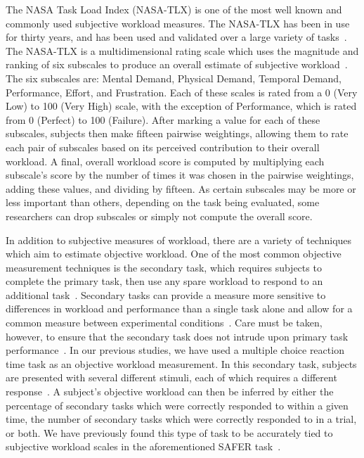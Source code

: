 \documentclass[float=false, crop=false]{standalone}
\begin{document}
The NASA Task Load Index (NASA-TLX) is one of the most well known and commonly used subjective workload measures.
The NASA-TLX has been in use for thirty years, and has been used and validated over a large variety of tasks~\cite{Hart2006}.
The NASA-TLX is a multidimensional rating scale which uses the magnitude and ranking of six subscales to produce an overall estimate of subjective workload~\cite{Hart1988}.
The six subscales are: Mental Demand, Physical Demand, Temporal Demand, Performance, Effort, and Frustration.
Each of these scales is rated from a 0 (Very Low) to 100 (Very High) scale, with the exception of Performance, which is rated from 0 (Perfect) to 100 (Failure).
After marking a value for each of these subscales, subjects then make fifteen pairwise weightings, allowing them to rate each pair of subscales based on its perceived contribution to their overall workload.
A final, overall workload score is computed by multiplying each subscale's score by the number of times it was chosen in the pairwise weightings, adding these values, and dividing by fifteen.
As certain subscales may be more or less important than others, depending on the task being evaluated, some researchers can drop subscales or simply not compute the overall score.

In addition to subjective measures of workload, there are a variety of techniques which aim to estimate objective workload.
One of the most common objective measurement techniques is the secondary task, which requires subjects to complete the primary task, then use any spare workload to respond to an additional task~\cite{gawron2008human}.
Secondary tasks can provide a measure more sensitive to differences in workload and performance than a single task alone and allow for a common measure between experimental conditions~\cite{slocum1971meaningful}.
Care must be taken, however, to ensure that the secondary task does not intrude upon primary task performance~\cite{williges1979behavioral}.
In our previous studies, we have used a multiple choice reaction time task as an objective workload measurement.
In this secondary task, subjects are presented with several different stimuli, each of which requires a different response~\cite{lysaght1989operator}.
A subject's objective workload can then be inferred by either the percentage of secondary tasks which were correctly responded to within a given time, the number of secondary tasks which were correctly responded to in a trial, or both.
We have previously found this type of task to be accurately tied to subjective workload scales in the aforementioned SAFER task~\cite{Karasinski2017}.
\end{document}
